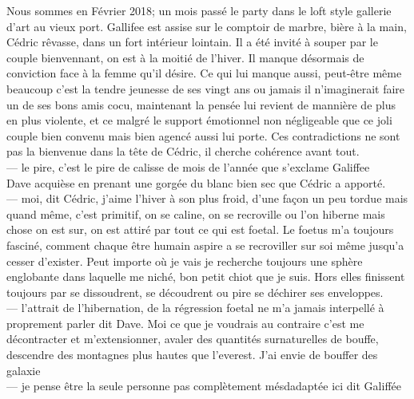 \documentclass{article}
\begin{document}
Nous sommes en Février 2018; un mois passé le party dans le loft style gallerie
d'art au vieux port. Gallifee est assise sur le comptoir de marbre, bière à la
main, Cédric rêvasse, dans un fort intérieur lointain. Il a été invité à souper
par le couple bienvennant, on est à la moitié de l'hiver. Il manque désormais de
conviction face à la femme qu'il désire. Ce qui lui manque aussi, peut-être même
beaucoup c'est la tendre jeunesse de ses vingt ans ou jamais il n'imaginerait
faire un de ses bons amis cocu, maintenant la pensée lui revient de mannière de
plus en plus violente, et ce malgré le support émotionnel non négligeable que ce
joli couple bien convenu mais bien agencé aussi lui porte.  Ces contradictions
ne sont pas la bienvenue dans la tête de Cédric, il cherche cohérence avant
tout. \\

--- le pire, c'est le pire de calisse de mois de l'année que s'exclame Galiffee\\

Dave acquièse en prenant une gorgée du blanc bien sec que Cédric a
apporté.\\

--- moi, dit Cédric, j'aime l'hiver à son plus froid, d'une façon un
peu tordue mais quand même, c'est primitif, on se caline, on se recroville ou
l'on hiberne mais chose on est sur, on est attiré par tout ce qui est foetal. Le
foetus m'a toujours fasciné, comment chaque être humain aspire a se recroviller
sur soi même jusqu'a cesser d'exister. Peut importe où je vais je recherche
toujours une sphère englobante dans laquelle me niché, bon petit chiot que je
suis. Hors elles finissent toujours par se dissoudrent, se découdrent ou pire se
déchirer ses enveloppes.\\

--- l'attrait de l'hibernation, de la régression foetal ne m'a jamais interpellé
à proprement parler dit Dave. Moi ce que je voudrais au contraire c'est me décontracter
et m'extensionner, avaler des quantités surnaturelles de bouffe, descendre des montagnes
plus hautes que l'everest. J'ai envie de bouffer des galaxie\\

--- je pense être la seule personne pas complètement mésdadaptée ici dit Galiffée\\
\end{document}
